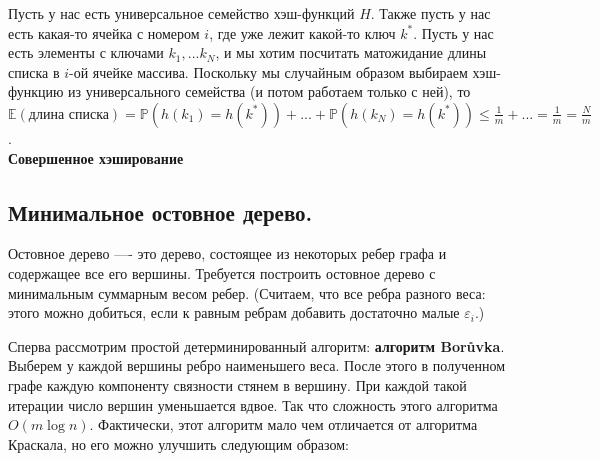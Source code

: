 \documentclass[a4paper]{article}
\theoremstyle{indented}
\theoremstyle{definition}
\theoremstyle{remark}
\begin{document}
Пусть у нас есть универсальное семейство хэш-функций $H$. Также пусть у нас есть какая-то ячейка с номером $i$, где уже лежит какой-то ключ $k^*$. Пусть у нас есть элементы с ключами $k_1, ... k_N$, и мы хотим посчитать матожидание длины списка в $i$-ой ячейке массива. Поскольку мы случайным образом выбираем хэш-функцию из универсального семейства (и потом работаем только с ней), то $\mathbb{E}(\text{длина списка})=\mathbb{P}(h(k_1)=h(k^*))+...+\mathbb{P}(h(k_N)=h(k^*)) \leq \frac{1}{m}+...=\frac{1}{m}=\frac{N}{m}$.
\\
\textbf{Совершенное хэширование}
\\

\subsection{Минимальное остовное дерево.} 

Остовное дерево —- это дерево, состоящее из некоторых ребер графа и
содержащее все его вершины. Требуется построить остовное дерево с
минимальным суммарным весом ребер. (Считаем, что все ребра разного
веса: этого можно добиться, если к равным ребрам добавить
достаточно малые $\varepsilon_i$.)

Сперва рассмотрим простой детерминированный алгоритм:
{\bf алгоритм Bor{\r u}vka}.
Выберем у каждой вершины ребро наименьшего веса. После этого в
полученном графе каждую компоненту связности стянем в вершину. При
каждой такой итерации число вершин уменьшается вдвое. Так что
сложность этого алгоритма $O(m\log{n})$. Фактически, этот алгоритм
мало чем отличается от алгоритма Краскала, но его можно улучшить
следующим образом: \\
\end{document}
